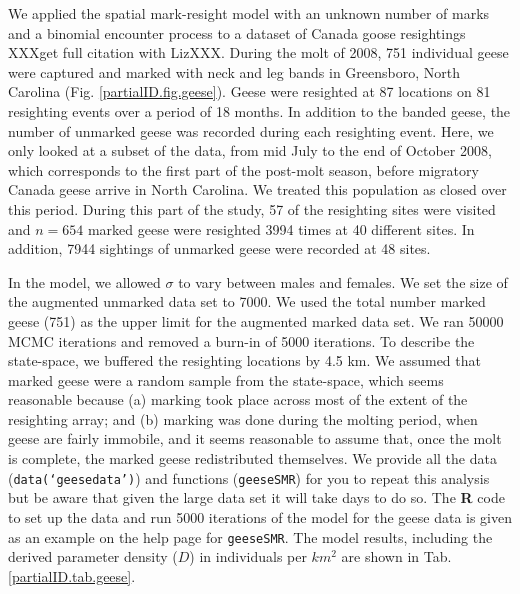 We applied the spatial mark-resight model with an unknown number of
marks and a binomial encounter process to a dataset of Canada goose
resightings \citep{rutledge:2012} XXXget full citation with
LizXXX. During the molt of 2008, 751 individual geese were captured
and marked with neck and leg bands in Greensboro, North Carolina
(Fig. \ref{partialID.fig.geese}). Geese were resighted at 87
locations
on 81 resighting events over a period of 18 months. In addition to the
banded geese, the number of unmarked geese was recorded during each
resighting event. Here, we only looked at a subset of the data, from
mid July to the end of October 2008, which corresponds to the first
part of the post-molt season, before migratory Canada geese arrive in
North Carolina. We treated this population as closed over this period.
During this part of the study, 57 of the resighting sites were visited and $n = 654$ marked geese were resighted 3994 times at 40 different sites. In addition, 7944 sightings of unmarked geese were recorded at 48 sites.

In the model, we allowed $\sigma$ to vary between males and
females. We set the size of the augmented unmarked data set to 7000. We used the total number marked geese (751) as the upper limit for the augmented marked data set. We ran 50000 MCMC iterations and removed a burn-in of 5000 iterations. To describe the state-space, we buffered the resighting locations by 4.5 km. We assumed that marked geese were a random sample from the state-space, which seems reasonable because (a) marking took place across most of the extent of the resighting array; and (b) marking was done during the molting period, when geese are fairly immobile, and it seems reasonable to assume that, once the molt is complete, the marked geese redistributed themselves. We provide all the data ({\tt data(`geesedata')}) and functions ({\tt geeseSMR}) for you to repeat this analysis but be aware that given the large data set it will take days to do so. The {\bf R} code to set up the data and run 5000 iterations of the model for the geese data is given as an example on the help page for {\tt geeseSMR}. The model results, including the derived parameter density ($D$) in individuals per $km^2$ are shown in Tab. \ref{partialID.tab.geese}.


